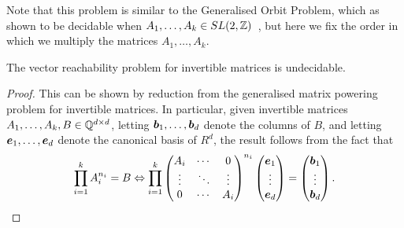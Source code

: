 Note that this problem is similar to the Generalised Orbit Problem, which as shown to be decidable when $A_{1}, \ldots, A_{k} \in SL(2,\mathbb{Z})$~\cite{VRP}, but here we fix the order in which we multiply the matrices $A_{1}, \ldots, A_{k}$.

\begin{theorem}
The vector reachability problem for invertible matrices is undecidable.
\end{theorem}

\begin{proof}
This can be shown by reduction from the generalised matrix powering problem for invertible matrices. In particular, given invertible matrices $A_{1}, \ldots, A_{k}, B \in \mathbb{Q}^{d \times d}$, letting $\boldsymbol{b}_{1}, \ldots, \boldsymbol{b}_{d}$ denote the columns of $B$, and letting $\boldsymbol{e}_{1}, \ldots, \boldsymbol{e}_{d}$ denote the canonical basis of $R^{d}$, the result follows from the fact that
    \begin{equation*}
        \prod\limits_{i=1}^{k} A_{i}^{n_{i}} = B \Leftrightarrow
        \prod\limits_{i=1}^{k}
        \begin{pmatrix}
            A_{i} & \cdots & 0 \\
            \vdots& \ddots & \vdots \\
            0 & \cdots & A_{i}
        \end{pmatrix}^{n_{i}}
        \begin{pmatrix}
            \boldsymbol{e}_{1} \\
            \vdots \\
            \boldsymbol{e}_{d}
        \end{pmatrix} =
        \begin{pmatrix}
            \boldsymbol{b}_{1} \\
            \vdots \\
            \boldsymbol{b}_{d}
        \end{pmatrix}.
    \end{equation*}
\end{proof}
